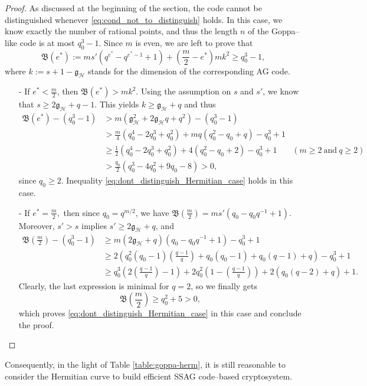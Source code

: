 \documentclass[a4paper]{amsart}
\theoremstyle{definition}
\theoremstyle{remark}
\newcommand{\calH}{\mathcal{H}}
\begin{document}
\begin{proof}
    As discussed at the beginning of the section, the code cannot be distinguished whenever \eqref{eq:cond_not_to_distinguish} holds. In this case, we know exactly the number of rational points, and thus the length $n$ of the Goppa--like code is at most $q_0^3-1$. Since $m$ is even, we are left to prove that 
    \begin{equation} \label{eq:dont_distinguish_Hermitian_case}
    \mathfrak{B}(e^*) := ms'(q^{e^*}-q^{e^*-1}+1) + \left( \frac{m}{2}-e^*\right)mk^2 \geq q_0^3-1,
    \end{equation}
    where $k := s+1-\mathfrak{g}_{\calH}$ stands  for the dimension of the corresponding AG code.
    \begin{itemize}
        \item [-] If $e^* < \frac{m}{2}$, then $\mathfrak{B}(e^*) > mk^2$. Using the assumption on $s$ and $s'$, we know that $s \geq 2\mathfrak{g}_{\calH}+q-1$. This yields $k \geq \mathfrak{g}_{\calH}+q$ and thus
        \begin{align*}
\mathfrak{B}(e^*) - (q_0^3-1) 
&> m(\mathfrak{g}_{\calH}^2+2\mathfrak{g}_{\calH}q+q^2)-(q_0^3-1)&\\
& > \frac{m}{4}(q_0^4-2q_0^3+q_0^2) + mq(q_0^2-q_0+q) -q_0^3+1 &\\
& \geq \frac{1}{2}(q_0^4-2q_0^3+q_0^2)+4(q_0^2-q_0+2)-q_0^3+1 \quad &(m\geq 2 \ \mathrm{and} \ q\geq 2)&\\
& > \frac{q_0}{2} (q_0^3-4q_0^2+9q_0-8) > 0,&
        \end{align*}
        since $q_0 \geq 2$. Inequality \eqref{eq:dont_distinguish_Hermitian_case} holds in this case.
        \item[-] If $e^* = \frac{m}{2},$ then since $q_0=q^{m/2}$, we have $\mathfrak{B}\left(\frac{m}{2}\right) = ms'(q_0-q_0q^{-1}+1)$. Moreover, $s'>s$ implies $s' \geq 2\mathfrak{g}_{\calH}+q$, and
        \begin{align*}
           \mathfrak{B}\left(\frac{m}{2}\right) - (q_0^3-1) 
           &\geq m(2\mathfrak{g}_{\calH}+q)(q_0-q_0q^{-1}+1)-q_0^3+1 \\ 
           &\geq 2\left(q_0^2(q_0-1)\left(\frac{q-1}{q}\right)+q_0(q_0-1)+q_0(q-1)+q\right)-q_0^3+1 \\
           & \geq q_0^3\left(2\left(\frac{q-1}{q}\right)-1\right) + 2q_0^2\left(1-\left(\frac{q-1}{q}\right)\right) + 2(q_0(q-2)+q)+1.
        \end{align*}
        Clearly, the last expression is minimal for $q=2$, so we finally gets
        $$\mathfrak{B}\left(\frac{m}{2}\right) \geq q_0^2 + 5 >0,$$
        which proves \eqref{eq:dont_distinguish_Hermitian_case} in this case and conclude the proof.
    \end{itemize}
\end{proof}
Consequently, in the light of Table \ref{table:goppa-herm}, it is still reasonable to consider the Hermitian curve to build efficient SSAG code--based cryptosystem.
\end{document}
